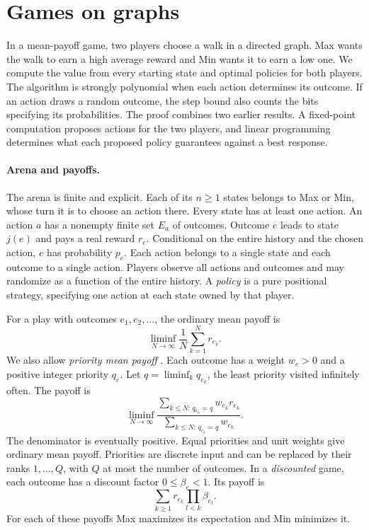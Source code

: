 \section{Games on graphs}\label{sec:games}

In a mean-payoff game, two players choose a walk in a directed graph.
Max wants the walk to earn a high average reward and Min wants it to
earn a low one. We compute the value from every starting state and
optimal policies for both players. The algorithm is strongly polynomial
when each action determines its outcome. If an action draws a random
outcome, the step bound also counts the bits specifying its
probabilities. The proof combines two earlier results. A fixed-point
computation proposes actions for the two players, and linear programming
determines what each proposed policy guarantees against a best response.

\paragraph{Arena and payoffs.}
The arena is finite and explicit. Each of its \(n\ge1\) states belongs
to Max or Min, whose turn it is to choose an action there. Every state
has at least one action. An action \(a\) has a nonempty finite set
\(E_a\) of outcomes. Outcome \(e\) leads to state \(j(e)\) and pays a
real reward \(r_e\). Conditional on the entire history and the chosen
action, \(e\) has probability \(p_e\). Each action belongs to a single
state and each outcome to a single action. Players observe all actions
and outcomes and may randomize as a function of the entire history.
A \emph{policy} is a pure positional strategy, specifying one action
at each state owned by that player.

For a play with outcomes \(e_1,e_2,\ldots\), the ordinary mean payoff is
\[
    \liminf_{N\to\infty}\frac1N\sum_{k=1}^N r_{e_k}.
\]
We also allow \emph{priority mean payoff} \cite{GZ}. Each outcome has
a weight \(w_e>0\) and a positive integer priority \(q_e\). Let
\(q=\liminf_k q_{e_k}\), the least priority visited infinitely often.
The payoff is
\[
  \liminf_{N\to\infty}
  \frac{\sum_{k\le N:\,q_{e_k}=q} w_{e_k}r_{e_k}}
       {\sum_{k\le N:\,q_{e_k}=q} w_{e_k}} .
\]
The denominator is eventually positive. Equal priorities and unit weights
give ordinary mean payoff. Priorities are discrete input and can be
replaced by their ranks \(1,\ldots,Q\), with \(Q\) at most the number
of outcomes. In a \emph{discounted} game, each outcome has a discount
factor \(0\le\beta_e<1\). Its payoff is
\[
   \sum_{k\ge1} r_{e_k}\prod_{l<k}\beta_{e_l}.
\]
For each of these payoffs Max maximizes its expectation and Min
minimizes it.

